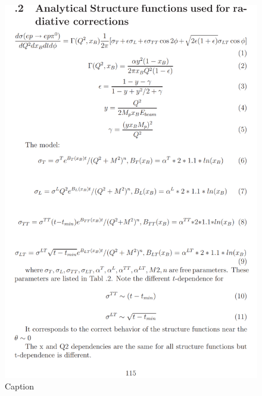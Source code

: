 \documentclass[oneside]{book}
\begin{document}
\begin{figure}
    \centering
    \includegraphics[scale=0.4]{radCorCLAS6.png}
    \caption{Caption}
    \label{fig:my_label}
\end{figure}
\end{document}
